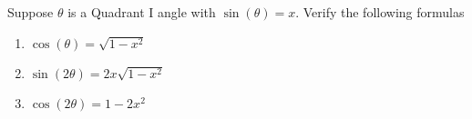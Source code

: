 {\label{preludetoarctrigsine} Suppose $\theta$ is a Quadrant I angle with $\sin(\theta) = x$. Verify the following formulas

\begin{enumerate}

\item  $\cos(\theta) = \sqrt{1-x^2}$

\item  $\sin(2\theta) = 2x\sqrt{1-x^2}$

\item $\cos(2\theta) = 1 - 2x^2$

\end{enumerate}}
{}